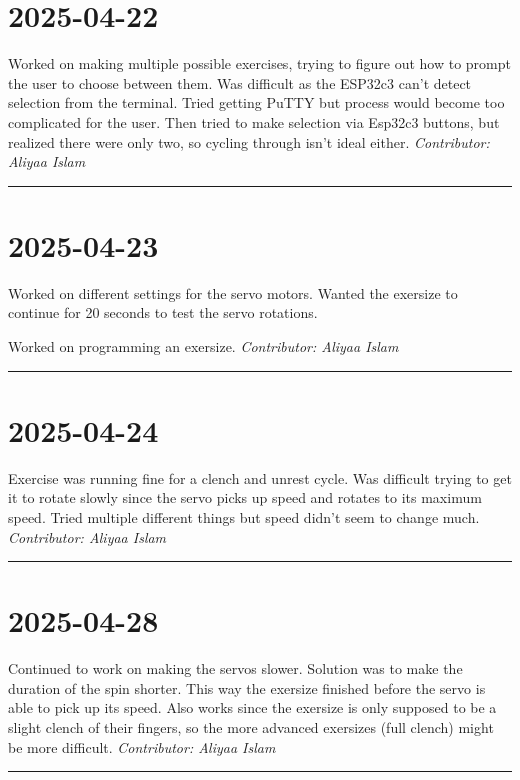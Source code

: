\documentclass[12pt]{article}
\begin{document}
\section*{2025-04-22}
Worked on making multiple possible exercises, trying to figure out how to prompt the user to choose between them. Was difficult as the ESP32c3 can't detect selection from the terminal.  
Tried getting PuTTY but process would become too complicated for the user. Then tried to make selection via Esp32c3 buttons, but realized there were only two, so cycling through isn't ideal either.
\vspace{1em}
\noindent\textit{Contributor: Aliyaa Islam}
\vspace{1em}
\hrule

\section*{2025-04-23}
Worked on different settings for the servo motors. Wanted the exersize to continue for 20 seconds to test the servo rotations. 

Worked on programming an exersize. 
\vspace{1em}
\noindent\textit{Contributor: Aliyaa Islam}
\vspace{1em}
\hrule

\section*{2025-04-24}
Exercise was running fine for a clench and unrest cycle. Was difficult trying to get it to rotate slowly since the servo picks up speed and rotates to its maximum speed. Tried multiple different things but speed didn't seem to change much.
\vspace{1em}
\noindent\textit{Contributor: Aliyaa Islam}
\vspace{1em}
\hrule

\section*{2025-04-28}
Continued to work on making the servos slower. Solution was to make the duration of the spin shorter. This way the exersize finished before the servo is able to pick up its speed. Also works since the exersize is only supposed to be a slight clench of their fingers, so the more advanced exersizes (full clench) might be more difficult. 
\vspace{1em}
\noindent\textit{Contributor: Aliyaa Islam}
\vspace{1em}
\hrule
\end{document}
